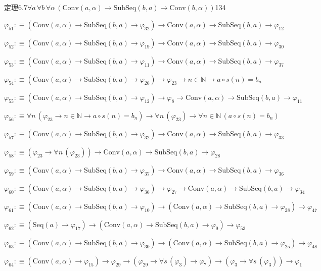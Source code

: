 \begin{fullproof}{定理6.7}{$\forall a\,\forall b\,\forall \alpha\,(\mathrm{Conv}(a,\alpha) \to \mathrm{SubSeq}(b,a) \to \mathrm{Conv}(b,\alpha))$}{134}
\begin{abbrevlist}
\item $\varphi_{51} :\equiv (\mathrm{Conv}(a,\alpha) \to \mathrm{SubSeq}(b,a) \to \varphi_{32}) \to \mathrm{Conv}(a,\alpha) \to \mathrm{SubSeq}(b,a) \to \varphi_{12}$
\item $\varphi_{52} :\equiv (\mathrm{Conv}(a,\alpha) \to \mathrm{SubSeq}(b,a) \to \varphi_{19}) \to \mathrm{Conv}(a,\alpha) \to \mathrm{SubSeq}(b,a) \to \varphi_{30}$
\item $\varphi_{53} :\equiv (\mathrm{Conv}(a,\alpha) \to \mathrm{SubSeq}(b,a) \to \varphi_{11}) \to \mathrm{Conv}(a,\alpha) \to \mathrm{SubSeq}(b,a) \to \varphi_{37}$
\item $\varphi_{54} :\equiv (\mathrm{Conv}(a,\alpha) \to \mathrm{SubSeq}(b,a) \to \varphi_{26}) \to \varphi_{23} \to n \in \mathbb{N} \to a \circ s(n) = b_{n}$
\item $\varphi_{55} :\equiv (\mathrm{Conv}(a,\alpha) \to \mathrm{SubSeq}(b,a) \to \varphi_{12}) \to \varphi_{8} \to \mathrm{Conv}(a,\alpha) \to \mathrm{SubSeq}(b,a) \to \varphi_{11}$
\item $\varphi_{56} :\equiv \forall n\,(\varphi_{23} \to n \in \mathbb{N} \to a \circ s(n) = b_{n}) \to \forall n\,(\varphi_{23}) \to \forall n \in \mathbb{N}\,(a \circ s(n) = b_{n})$
\item $\varphi_{57} :\equiv (\mathrm{Conv}(a,\alpha) \to \mathrm{SubSeq}(b,a) \to \varphi_{32}) \to \mathrm{Conv}(a,\alpha) \to \mathrm{SubSeq}(b,a) \to \varphi_{33}$
\item $\varphi_{58} :\equiv (\varphi_{23} \to \forall n\,(\varphi_{23})) \to \mathrm{Conv}(a,\alpha) \to \mathrm{SubSeq}(b,a) \to \varphi_{28}$
\item $\varphi_{59} :\equiv (\mathrm{Conv}(a,\alpha) \to \mathrm{SubSeq}(b,a) \to \varphi_{37}) \to \mathrm{Conv}(a,\alpha) \to \mathrm{SubSeq}(b,a) \to \varphi_{36}$
\item $\varphi_{60} :\equiv (\mathrm{Conv}(a,\alpha) \to \mathrm{SubSeq}(b,a) \to \varphi_{36}) \to \varphi_{27} \to \mathrm{Conv}(a,\alpha) \to \mathrm{SubSeq}(b,a) \to \varphi_{34}$
\item $\varphi_{61} :\equiv (\mathrm{Conv}(a,\alpha) \to \mathrm{SubSeq}(b,a) \to \varphi_{10}) \to (\mathrm{Conv}(a,\alpha) \to \mathrm{SubSeq}(b,a) \to \varphi_{28}) \to \varphi_{47}$
\item $\varphi_{62} :\equiv (\mathrm{Seq}(a) \to \varphi_{17}) \to (\mathrm{Conv}(a,\alpha) \to \mathrm{SubSeq}(b,a) \to \varphi_{9}) \to \varphi_{53}$
\item $\varphi_{63} :\equiv (\mathrm{Conv}(a,\alpha) \to \mathrm{SubSeq}(b,a) \to \varphi_{30}) \to (\mathrm{Conv}(a,\alpha) \to \mathrm{SubSeq}(b,a) \to \varphi_{25}) \to \varphi_{48}$
\item $\varphi_{64} :\equiv (\mathrm{Conv}(a,\alpha) \to \varphi_{15}) \to \varphi_{29} \to (\varphi_{29} \to \forall s\,(\varphi_{3}) \to \varphi_{7}) \to (\varphi_{3} \to \forall s\,(\varphi_{3})) \to \varphi_{1}$
\end{abbrevlist}
\end{fullproof}
